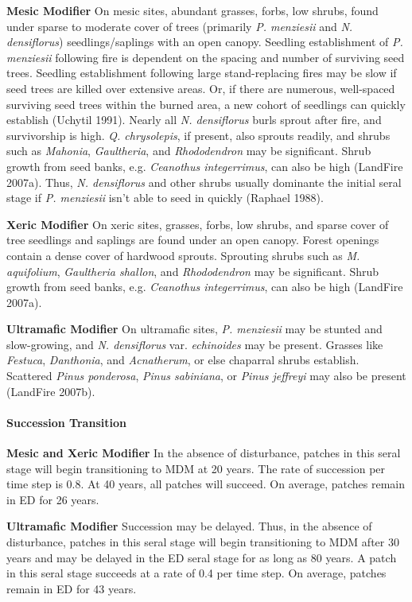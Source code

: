 \begin{adjustwidth}{2cm}{}
\textbf{Mesic Modifier } On mesic sites, abundant grasses, forbs, low shrubs, found under sparse to moderate cover of trees (primarily \emph{P. menziesii} and \emph{N. densiflorus}) seedlings/saplings with an open canopy. Seedling establishment of \emph{P. menziesii} following fire is dependent on the spacing and number of surviving seed trees. Seedling establishment following large stand-replacing fires may be slow if seed trees are killed over extensive areas. Or, if there are numerous, well-spaced surviving seed trees within the burned area, a new cohort of seedlings can quickly establish (Uchytil 1991). Nearly all \emph{N. densiflorus} burls sprout after fire, and survivorship is high. \emph{Q. chrysolepis}, if present, also sprouts readily, and shrubs such as \emph{Mahonia}, \emph{Gaultheria}, and \emph{Rhododendron} may be significant. Shrub growth from seed banks, e.g. \emph{Ceanothus integerrimus}, can also be high (LandFire 2007a). Thus, \emph{N. densiflorus} and other shrubs usually dominante the initial seral stage if \emph{P. menziesii} isn’t able to seed in quickly (Raphael 1988).

\medskip
\noindent \textbf{Xeric Modifier}  On xeric sites, grasses, forbs, low shrubs, and sparse cover of tree seedlings and saplings are found under an open canopy. Forest openings contain a dense cover of hardwood sprouts. Sprouting shrubs such as \emph{M. aquifolium}, \emph{Gaultheria shallon}, and \emph{Rhododendron} may be significant. Shrub growth from seed banks, e.g. \emph{Ceanothus integerrimus}, can also be high (LandFire 2007a). 


\medskip
\noindent \textbf{Ultramafic Modifier}  On ultramafic sites, \emph{P. menziesii} may be stunted and slow-growing, and \emph{N. densiflorus} var. \emph{echinoides} may be present. Grasses like \emph{Festuca}, \emph{Danthonia}, and \emph{Acnatherum}, or else chaparral shrubs establish. Scattered \emph{Pinus ponderosa}, \emph{Pinus sabiniana}, or \emph{Pinus jeffreyi} may also be present (LandFire 2007b).

\end{adjustwidth}

\paragraph{Succession Transition}
\begin{adjustwidth}{2cm}{}
\textbf{Mesic and Xeric Modifier } In the absence of disturbance, patches in this seral stage will begin transitioning to MDM at 20 years. The rate of succession per time step is 0.8. At 40 years, all patches will succeed. On average, patches remain in ED for 26 years.


\medskip
\noindent \textbf{Ultramafic Modifier} Succession may be delayed. Thus, in the absence of disturbance, patches in this seral stage will begin transitioning to MDM after 30 years and may be delayed in the ED seral stage for as long as 80 years. A patch in this seral stage succeeds at a rate of 0.4 per time step. On average, patches remain in ED for 43 years.

\end{adjustwidth}

